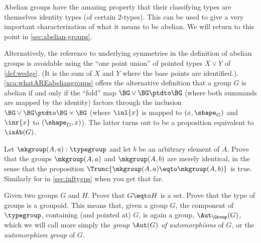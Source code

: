 \begin{remark}
  \label{rem:whatAREabeliangroups}

  Abelian groups have the amazing property that their classifying types are themselves identity types (of certain $2$-types).
  This can be used to give a very important characterization of what it means to be abelian.
  We will return to this point in \cref{sec:abelian-groups}.

  Alternatively, the reference to underlying symmetries in the definition of abelian groups is avoidable using the ``one point union'' of pointed types $X\vee Y$ of \cref{def:wedge}. (It is the sum of $X$ and $Y$ where the base points are identified.). \cref{xca:whatAREabeliangroups}
offers the alternative definition that a group $G$ is abelian if and only if
the ``fold'' map $\BG\vee \BG\ptdto \BG$ (where both summands are mapped by
the identity) factors through the inclusion $\BG\vee\BG\ptdto\BG\times\BG$
(where $\inl{x}$ is mapped to $(x,\sh_G)$ and $\inr{x}$ to $(\sh_G,x)$).
The latter turns out to be a proposition equivalent to $\isAb(G)$.
\end{remark}

\begin{xca}
  Let $\mkgroup(A,a):\typegroup$ and let $b$ be an arbitrary element of $A$.
  Prove that the groups $\mkgroup(A,a)$ and $\mkgroup(A,b)$ are 
  merely identical, in the sense that the proposition
  $\Trunc{\mkgroup(A,a)\eqto\mkgroup(A,b)}$ is true.
  Similarly for \inftygps in \cref{sec:inftygps} when you get that far.
\end{xca}

  \begin{xca}\label{xca:typegroupisgroupoid}
    Given two groups $G$ and $H$.  Prove that $G\eqto H$ is a set.
    Prove that the type of groups is a groupoid.
    This means that, given a group $G$, the component of $\typegroup$,
    containing (and pointed at) $G$, is again a group, $\Aut_\Group(G)$,
    which we will call more simply the \emph{group $\Aut(G)$ of automorphisms}%
     of $G$,
    or the \emph{automorphism group} of $G$.
  \end{xca}

